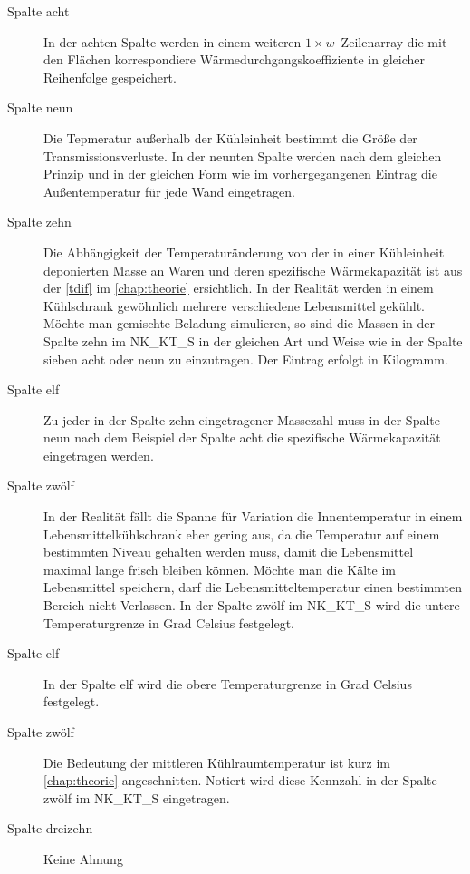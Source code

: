 \begin{description}
	\item [{Spalte acht}] In der achten Spalte werden in einem weiteren
	$1\times w\,$-Zeilenarray die mit den Flächen korrespondiere
	Wärmedurchgangskoeffiziente in gleicher
	Reihenfolge gespeichert.

	\item [{Spalte neun}] Die Tepmeratur außerhalb der Kühleinheit
	bestimmt die Größe der Transmissionsverluste. In
	der neunten Spalte werden nach dem gleichen Prinzip und in der gleichen
	Form wie im vorhergegangenen Eintrag die Außentemperatur für jede Wand
	eingetragen.

	\item [{Spalte zehn}] Die Abhängigkeit der Temperaturänderung von der in
	einer Kühleinheit deponierten Masse an Waren und deren spezifische
	Wärmekapazität ist aus der \cref{tdif} im \cref{chap:theorie}
	ersichtlich. In der Realität werden in einem Kühlschrank gewöhnlich
	mehrere verschiedene Lebensmittel gekühlt. Möchte man gemischte Beladung
	simulieren, so sind die Massen in der Spalte zehn im NK\_KT\_S in der
	gleichen Art und Weise wie in der Spalte sieben acht oder neun zu
	einzutragen. Der Eintrag erfolgt in Kilogramm.

	\item [{Spalte elf}] Zu jeder in der Spalte zehn eingetragener Massezahl
	muss in der Spalte neun nach dem Beispiel der Spalte acht die
	spezifische Wärmekapazität eingetragen werden.

	\item [{Spalte zwölf}] In der Realität fällt die Spanne für Variation
	die Innentemperatur in einem Lebensmittelkühlschrank eher gering aus, da
	die Temperatur auf einem bestimmten Niveau gehalten werden muss, damit
	die Lebensmittel maximal lange frisch bleiben können. Möchte man die
	Kälte im Lebensmittel speichern, darf die Lebensmitteltemperatur einen
	bestimmten Bereich nicht Verlassen. In der Spalte zwölf im NK\_KT\_S
	wird die untere Temperaturgrenze in Grad Celsius festgelegt.

	\item [{Spalte elf}] In der Spalte elf wird die obere Temperaturgrenze
	in Grad Celsius festgelegt.

	\item [{Spalte zwölf}] Die Bedeutung der mittleren
	Kühlraumtemperatur ist kurz im \cref{chap:theorie} angeschnitten.
	Notiert wird diese Kennzahl in der Spalte zwölf im NK\_KT\_S
	eingetragen.

	\item [{Spalte dreizehn}] Keine Ahnung

\end{description}
